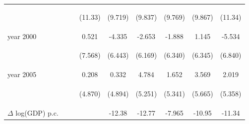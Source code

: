 \begin{landscape}
\begin{table}[htpb!]
\begin{center}
\begin{tabular}{lcccccccc}
&&&\begin{footnotesize}(11.33)\end{footnotesize}&\begin{footnotesize}(9.719)\end{footnotesize}&\begin{footnotesize}(9.837)\end{footnotesize}&\begin{footnotesize}(9.769)\end{footnotesize}&\begin{footnotesize}(9.867)\end{footnotesize}&\begin{footnotesize}(11.34)\end{footnotesize}\\
year 2000&&&0.521&-4.335&-2.653&-1.888&1.145&-5.534\\
&&&\begin{footnotesize}(7.568)\end{footnotesize}&\begin{footnotesize}(6.443)\end{footnotesize}&\begin{footnotesize}(6.169)\end{footnotesize}&\begin{footnotesize}(6.340)\end{footnotesize}&\begin{footnotesize}(6.345)\end{footnotesize}&\begin{footnotesize}(6.840)\end{footnotesize}\\
year 2005&&&0.208&0.332&4.784&1.652&3.569&2.019\\
&&&\begin{footnotesize}(4.870)\end{footnotesize}&\begin{footnotesize}(4.894)\end{footnotesize}&\begin{footnotesize}(5.251)\end{footnotesize}&\begin{footnotesize}(5.341)\end{footnotesize}&\begin{footnotesize}(5.665)\end{footnotesize}&\begin{footnotesize}(5.358)\end{footnotesize}\\
$\Delta$ log(GDP) p.c.&&&&-12.38&-12.77&-7.965&-10.95&-11.34\\

\end{tabular}
\end{center}
\end{table}
\end{landscape}
